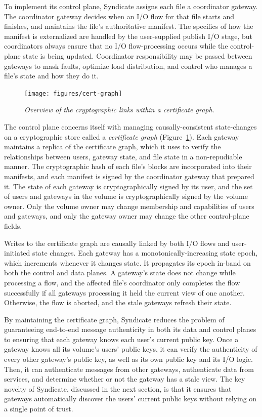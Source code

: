 To implement its control plane, Syndicate assigns each file a coordinator
gateway. The coordinator gateway decides when an I/O flow for that file starts
and finishes, and maintains the file's authoritative manifest. The specifics
of how the manifest is externalized are handled by the user-supplied publish I/O
stage, but coordinators always ensure that no I/O flow-processing occurs while
the control-plane state is being updated. Coordinator responsibility may be
passed between gateways to mask faults, optimize load distribution, and control
who manages a file's state and how they do it.


\begin{figure}[t!]
\centering
\texttt{[image: figures/cert-graph]}
\caption{\it
Overview of the cryptographic links within a certificate graph.
   }
\label{fig:cert-graph}
\end{figure}


The control plane concerns itself with managing causally-consistent
state-changes on a cryptographic store called a \textit{certificate graph}
(Figure~\ref{fig:cert-graph}). Each gateway
maintains a replica of the certificate graph, which it uses to verify the
relationships between users, gateway state, and file state in a non-repudiable
manner. The cryptographic hash of each file's blocks are incorporated into
their manifests, and each manifest is signed by the coordinator gateway that
prepared it. The state of each gateway is cryptographically signed by its user,
and the set of users and gateways in the volume is cryptographically signed by
the volume owner. Only the volume owner may change membership and capabilities
of users and gateways, and only the gateway owner may change the other
control-plane fields.


Writes to the certificate graph are causally linked by both I/O flows and
user-initiated state changes. Each gateway has a monotonically-increasing state
epoch, which increments whenever it changes state. It propagates its epoch
in-band on both the control and data planes. A gateway's state does not
change while processing a flow, and the affected file's coordinator only
completes the flow successfully if all gateways processing it held the current
view of one another. Otherwise, the flow is aborted, and the stale gateways
refresh their state.


By maintaining the certificate graph, Syndicate reduces the problem of
guaranteeing end-to-end message authenticity in both its data and control planes
to ensuring that each gateway knows each user's current public key. Once a
gateway knows all its volume's users' public keys, it can verify the
authenticity of every other gateway's public key, as well as its own public
key and its I/O logic. Then, it can authenticate messages from other gateways,
authenticate data from services, and determine whether or not the gateway has a
stale view. The key novelty of Syndicate, discussed in the next section, is that
it ensures that gateways automatically discover the users' current public
keys without relying on a single point of trust.

